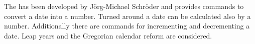\begin{comment}
\def\DayOfWeekLong{%
%
%
  \newcount\dow				%
  \newcount\leap			%
  \newcount\x				%
  \newcount\y 				%
  \leap=\month \advance\leap by -14 \divide\leap by 12
  \advance\leap by \year
  \dow=\month \advance\dow by 10
  \y=\dow \divide\y by 13 \multiply\y by 12
  \advance\dow by -\y \multiply\dow by 13 \advance\dow by -1 \divide\dow by 5
  \advance\dow by \day \advance\dow by 77
  \x=\leap \y=\x \divide\y by 100 \multiply\y by 100 \advance\x by -\y
  \multiply\x by 5 \divide\x by 4 \advance\dow by \x
  \x=\leap \divide\x by 400 \advance\dow by \x
  \x=\leap \divide\x by 100 \multiply\x by 2 \advance\dow by -\x
  \x=\dow \divide\x by 7 \multiply\x by 7 \advance\dow by -\x
  \ifcase\dow Sunday\or Monday\or Tuesday\or Wednesday\or
	Thursday\or Friday\or Saturday\fi
}

\def\DayOfWeekShort{%
%
%
  \newcount\dow				%
  \newcount\leap			%
  \newcount\x				%
  \newcount\y 				%
  \leap=\month \advance\leap by -14 \divide\leap by 12
  \advance\leap by \year
  \dow=\month \advance\dow by 10
  \y=\dow \divide\y by 13 \multiply\y by 12
  \advance\dow by -\y \multiply\dow by 13 \advance\dow by -1 \divide\dow by 5
  \advance\dow by \day \advance\dow by 77
  \x=\leap \y=\x \divide\y by 100 \multiply\y by 100 \advance\x by -\y
  \multiply\x by 5 \divide\x by 4 \advance\dow by \x
  \x=\leap \divide\x by 400 \advance\dow by \x
  \x=\leap \divide\x by 100 \multiply\x by 2 \advance\dow by -\x
  \x=\dow \divide\x by 7 \multiply\x by 7 \advance\dow by -\x
  \ifcase\dow Sun\or Mon\or Tue\or Wed\or
	Thur\or Fri\or Sat\fi
}


\DayOfWeekLong

\DayOfWeekShort
\end{comment}

\makeatother


The  has been developed by J\"org-Michael Schr\"oder and provides commands to convert a date into a number. Turned around a date can be calculated also by a number. Additionally there are commands for incrementing and decrementing a date. Leap years and the Gregorian calendar reform are considered.

